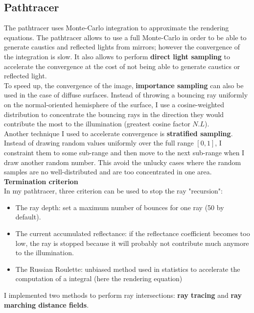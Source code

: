 \documentclass[a4paper,10pt]{article}
\begin{document}
\subsection{Pathtracer}


The pathtracer uses Monte-Carlo integration to approximate the rendering equations. The pathtracer allows to use a full Monte-Carlo in order to be able to generate caustics and reflected lights from mirrors; however the convergence of the integration is slow. It also allows to perform \textbf{direct light sampling} to accelerate the convergence at the cost of not being able to generate caustics or reflected light.\\

\noindent
To speed up, the convergence of the image, \textbf{importance sampling} can also be used in the case of diffuse surfaces. Instead of throwing a bouncing ray uniformly on the normal-oriented hemisphere of the surface, I use a cosine-weighted distribution to concentrate the bouncing rays in the direction they would contribute the most to the illumination (greatest cosine factor $N.L$). \\

\noindent
Another technique I used to accelerate convergence is \textbf{stratified sampling}. Instead of drawing random values uniformly over the full range $[0, 1]$, I constraint them to some sub-range and then move to the next sub-range when I draw another random number. This avoid the unlucky cases where the random samples are no well-distributed and are too concentrated in one area. \\

\noindent
\textbf{Termination criterion}\\
In my pathtracer, three criterion can be used to stop the ray "recursion":
\begin{itemize}
	\item The ray depth: set a maximum number of bounces for one ray (50 by default).
	\item The current accumulated reflectance: if the reflectance coefficient becomes too low, the ray is stopped because it will probably not contribute much anymore to the illumination.
	\item The Russian Roulette: unbiased method used in statistics to accelerate the computation of a integral (here the rendering equation)
\end{itemize}


\noindent
I implemented two methods to perform ray intersections: \textbf{ray tracing} and \textbf{ray marching distance fields}.
\end{document}

